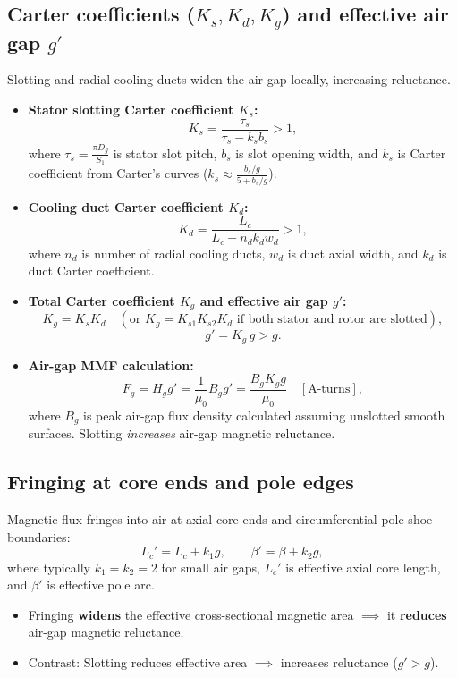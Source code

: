 \subsection{Carter coefficients ($K_s, K_d, K_g$) and effective air gap $g'$}
Slotting and radial cooling ducts widen the air gap locally, increasing reluctance.
\begin{itemize}
  \item \textbf{Stator slotting Carter coefficient $K_s$:}
  \[
  \boxed{K_s = \frac{\tau_s}{\tau_s - k_s b_s} > 1},
  \]
  where $\tau_s = \frac{\pi D_g}{S_1}$ is stator slot pitch, $b_s$ is slot opening width, and $k_s$ is Carter coefficient from Carter's curves ($k_s \approx \frac{b_s/g}{5 + b_s/g}$).
  \item \textbf{Cooling duct Carter coefficient $K_d$:}
  \[
  \boxed{K_d = \frac{L_c}{L_c - n_d k_d w_d} > 1},
  \]
  where $n_d$ is number of radial cooling ducts, $w_d$ is duct axial width, and $k_d$ is duct Carter coefficient.
  \item \textbf{Total Carter coefficient $K_g$ and effective air gap $g'$:}
  \[
  \boxed{K_g = K_s K_d} \quad(\text{or } K_g = K_{s1} K_{s2} K_d\text{ if both stator and rotor are slotted}),
  \]
  \[
  \boxed{g' = K_g\,g > g}.
  \]
  \item \textbf{Air-gap MMF calculation:}
  \[
  \boxed{F_g = H_g g' = \frac{1}{\mu_0} B_g g' = \frac{B_g K_g g}{\mu_0}}\quad[\mathrm{A\text{-}turns}],
  \]
  where $B_g$ is peak air-gap flux density calculated assuming unslotted smooth surfaces.
  Slotting \emph{increases} air-gap magnetic reluctance.
\end{itemize}

\subsection{Fringing at core ends and pole edges}
Magnetic flux fringes into air at axial core ends and circumferential pole shoe boundaries:
\[
\boxed{L_c' = L_c + k_1 g},
\qquad
\boxed{\beta' = \beta + k_2 g},
\]
where typically $k_1 = k_2 = 2$ for small air gaps, $L_c'$ is effective axial core length, and $\beta'$ is effective pole arc.
\begin{itemize}
  \item Fringing \textbf{widens} the effective cross-sectional magnetic area $\implies$ it \textbf{reduces} air-gap magnetic reluctance.
  \item Contrast: Slotting reduces effective area $\implies$ increases reluctance ($g' > g$).
\end{itemize}
